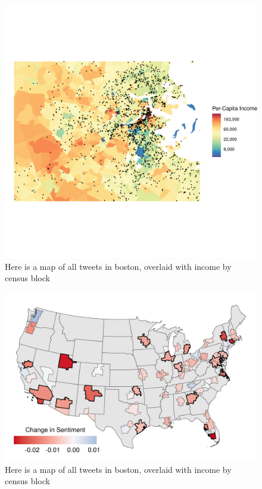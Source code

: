 \documentclass{article}
\begin{document}
\begin{figure}[H]
  \centering
  \includegraphics[width=\linewidth]{../res/Boston_Map.png}
  \caption{Here is a map of all tweets in boston, overlaid with income by census block}
  \label{fig:timeseries}
\end{figure}

\begin{figure}[H]
  \centering
  \includegraphics[width=\linewidth]{../res/map_wbgt.png}
  \caption{Here is a map of all tweets in boston, overlaid with income by census block}
  \label{fig:timeseries}
\end{figure}
\end{document}
